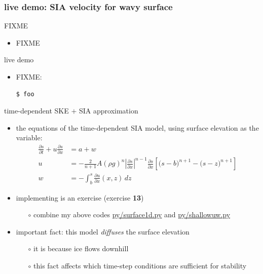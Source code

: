 \documentclass[10pt,dvipsnames]{beamer}
\begin{document}
\begin{frame}[fragile]
\frametitle{live demo: SIA velocity for wavy surface}
\begin{center}
FIXME %
\end{center}

\bigskip
\begin{itemize}
\item FIXME
\end{itemize}

\begin{block}{live demo}
\begin{itemize}
\item FIXME:
\begin{verbatim}
$ foo
\end{verbatim}
\end{itemize}
\end{block}
\end{frame}


\begin{frame}{time-dependent SKE $+$ SIA approximation}

\begin{itemize}
\item the equations of the \alert{time-dependent SIA model}, using surface elevation as the variable:
\begin{align*}
\frac{\partial s}{\partial t} + u \frac{\partial s}{\partial x} &= a + w \\
u &= - \frac{2}{n+1} A (\rho g)^n \left|\frac{\partial s}{\partial x}\right|^{n-1} \frac{\partial s}{\partial x} \left[\big(s - b\big)^{n+1} - \big(s-z\big)^{n+1}\right] \\
w &= - \int_{b}^{s} \frac{\partial u}{\partial x}(x,z)\,dz
\end{align*}
\item implementing is an exercise (exercise \textbf{13})
  \begin{itemize}
  \item[$\circ$] combine my above codes \href{https://github.com/bueler/mccarthy/blob/master/py/surace1d.py}{py/surface1d.py} and \href{https://github.com/bueler/mccarthy/blob/master/py/shallowuw.py}{py/shallowuw.py}
  \end{itemize}
\item important fact: \alert{this model \emph{diffuses} the surface elevation}
  \begin{itemize}
  \item[$\circ$] it is because ice flows downhill
  \item[$\circ$] this fact affects which time-step conditions are sufficient for stability
  \end{itemize}
\end{itemize}
\end{frame}
\end{document}
